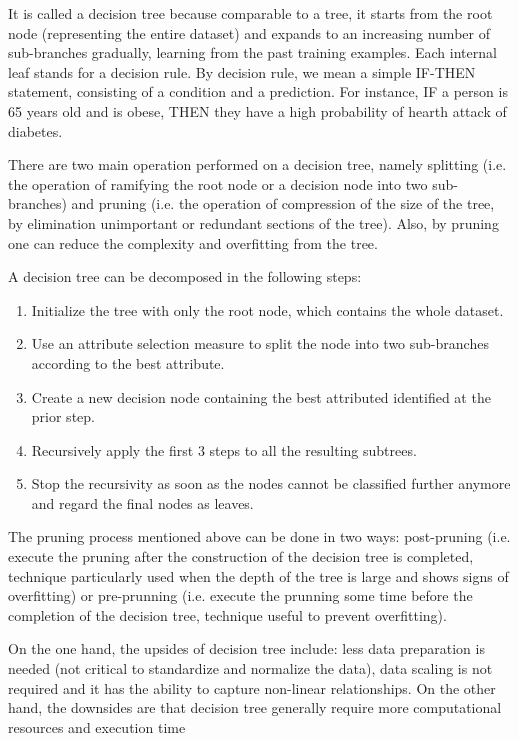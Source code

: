 It is called a decision tree because comparable to a tree, it starts from the root node (representing the entire dataset) and expands to an increasing number of sub-branches gradually, learning from the past training examples. Each internal leaf stands for a decision rule. By decision rule, we mean a simple IF-THEN statement, consisting of a condition and a prediction. For instance, IF a person is 65 years old and is obese, THEN they have a high probability of hearth attack of diabetes.

There are two main operation performed on a decision tree, namely splitting (i.e. the operation of ramifying the root node or a decision node into two sub-branches) and pruning (i.e. the operation of compression of the size of the tree, by elimination unimportant or redundant sections of the tree). Also, by pruning one can reduce the complexity and overfitting from the tree.

A decision tree can be decomposed in the following steps:
\begin{enumerate}
  \item Initialize the tree with only the root node, which contains the whole dataset.
  \item Use an attribute selection measure to split the node into two sub-branches according to the best attribute.
  \item Create a new decision node containing the best attributed identified at the prior step.
  \item Recursively apply the first 3 steps to all the resulting subtrees.
  \item Stop the recursivity as soon as the nodes cannot be classified further anymore and regard the final nodes as leaves.
\end{enumerate}

The pruning process mentioned above can be done in two ways: post-pruning (i.e. execute the pruning after the construction of the decision tree is completed, technique particularly used when the depth of the tree is large and shows signs of overfitting) or pre-prunning (i.e. execute the prunning some time before the completion of the decision tree, technique useful to prevent overfitting).

On the one hand, the upsides of decision tree include: less data preparation is needed (not critical to standardize and normalize the data), data scaling is not required and it has the ability to capture non-linear relationships. On the other hand, the downsides are that decision tree generally require more computational resources and execution time

